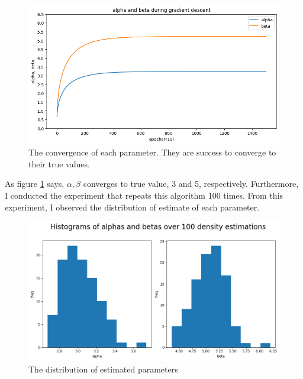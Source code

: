 \documentclass[10pt]{article}
\begin{document}
\begin{figure}[!h]
    \begin{center}
        \includegraphics[scale = 0.5]{"fig/fig1.png"}
    \end{center}
    \caption{The convergence of each parameter. They are success to converge to their true values.}
    \label{fig1}
\end{figure}
As figure \ref{fig1} says, $\alpha, \beta$ converges to true value, 3 and 5, respectively.
Furthermore, I conducted the experiment that repeats this algorithm 100 times. From this experiment, I observed the distribution of estimate of each parameter.

\begin{figure}[!h]
    \begin{center}
        \includegraphics[scale = 0.5]{"fig/fig2.png"}
    \end{center}
    \caption{The distribution of estimated parameters}
    \label{fig2}
\end{figure}
\end{document}
